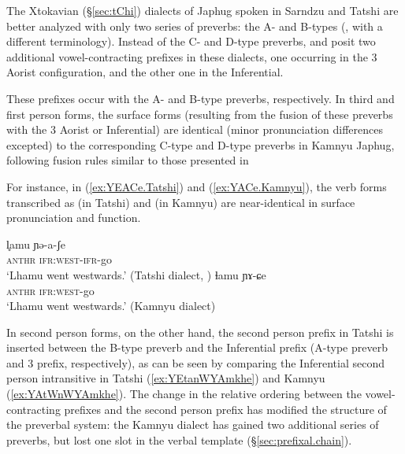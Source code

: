 The Xtokavian (§\ref{sec:tChi}) dialects of Japhug spoken in Sarndzu and Tatshi are better analyzed with only two series of preverbs: the A- and B-types (\citealt[70]{lin11direction}, with a different terminology). Instead of the C- and D-type preverbs, \citet{linluo03} and \citet{lin11direction} posit two additional vowel-contracting   prefixes in these dialects, one occurring in the 3\flobv{} Aorist configuration, and the other one in the Inferential.

These prefixes occur with the A- and B-type preverbs, respectively. In third and first person forms, the surface forms (resulting from the fusion of these preverbs with the  3\flobv{} Aorist or Inferential) are identical (minor pronunciation differences excepted) to the corresponding C-type and D-type preverbs in Kamnyu Japhug,  following fusion rules similar to those presented in 

For instance, in (\ref{ex:YEACe.Tatshi}) and (\ref{ex:YACe.Kamnyu}), the verb forms transcribed as  (in Tatshi) and  (in Kamnyu) are near-identical in surface pronunciation and function.

 \begin{exe}
 \ex 
 \begin{xlist}
 \ex \label{ex:YEACe.Tatshi}
 \gll l̥amu ɲə-a-ʃe \\
  \textsc{anthr} \textsc{ifr}:\textsc{west}-\textsc{ifr}-go \\
 \glt `Lhamu went westwards.' (Tatshi dialect, \citealt[70]{lin11direction})
  \ex \label{ex:YACe.Kamnyu}
 \gll ɬamu ɲɤ-ɕe \\
  \textsc{anthr} \textsc{ifr}:\textsc{west}-go \\
 \glt `Lhamu went westwards.' (Kamnyu dialect)
 \end{xlist}
 \end{exe}

In second person forms, on the other hand, the second person prefix in Tatshi is inserted between the B-type preverb and the  Inferential prefix (A-type preverb and  3\flobv{} prefix, respectively), as can be seen by comparing the Inferential second person intransitive in Tatshi (\ref{ex:YEtanWYAmkhe}) and Kamnyu (\ref{ex:YAtWnWYAmkhe}). The change in the relative ordering between the vowel-contracting prefixes and the second person prefix has modified the structure of the preverbal system: the Kamnyu dialect has gained two additional series of preverbs, but lost one slot in the verbal template (§\ref{sec:prefixal.chain}).  

